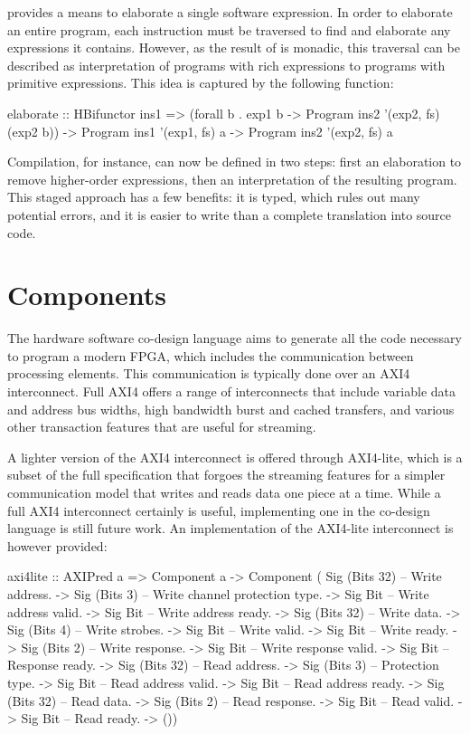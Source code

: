 \documentclass[../paper.tex]{subfiles}
\begin{document}
 provides a means to elaborate a single software expression. In order to elaborate an entire program, each instruction must be traversed to find and elaborate any expressions it contains. However, as the result of  is monadic, this traversal can be described as interpretation of programs with rich expressions to programs with primitive expressions. This idea is captured by the following function:

\begin{code}
elaborate :: HBifunctor ins1
    => (forall b . exp1 b -> Program ins2 '(exp2, fs) (exp2 b))
    -> Program ins1 '(exp1, fs) a -> Program ins2 '(exp2, fs) a
\end{code}

\noindent Compilation, for instance, can now be defined in two steps: first an elaboration to remove higher-order expressions, then an interpretation of the resulting program. This staged approach has a few benefits: it is typed, which rules out many potential errors, and it is easier to write than a complete translation into source code.

\section{Components}

The hardware software co-design language aims to generate all the code necessary to program a modern FPGA, which includes the communication between processing elements. This communication is typically done over an AXI4 interconnect. Full AXI4 offers a range of interconnects that include variable data and address bus widths, high bandwidth burst and cached transfers, and various other transaction features that are useful for streaming.

A lighter version of the AXI4 interconnect is offered through AXI4-lite, which is a subset of the full specification that forgoes the streaming features for a simpler communication model that writes and reads data one piece at a time. While a full AXI4 interconnect certainly is useful, implementing one in the co-design language is still future work. An implementation of the AXI4-lite interconnect is however provided:

\begin{code}
axi4lite :: AXIPred a
  => Component a
  -> Component (
          Sig (Bits 32) -- Write address.
       -> Sig (Bits 3)  -- Write channel protection type.
       -> Sig Bit       -- Write address valid.
       -> Sig Bit       -- Write address ready.
       -> Sig (Bits 32) -- Write data.
       -> Sig (Bits 4)  -- Write strobes.
       -> Sig Bit       -- Write valid.
       -> Sig Bit       -- Write ready.
       -> Sig (Bits 2)  -- Write response.
       -> Sig Bit       -- Write response valid.
       -> Sig Bit       -- Response ready.
       -> Sig (Bits 32) -- Read address.
       -> Sig (Bits 3)  -- Protection type.
       -> Sig Bit       -- Read address valid.
       -> Sig Bit       -- Read address ready.
       -> Sig (Bits 32) -- Read data.
       -> Sig (Bits 2)  -- Read response.
       -> Sig Bit       -- Read valid.
       -> Sig Bit       -- Read ready.    
       -> ())
\end{code}
\end{document}
